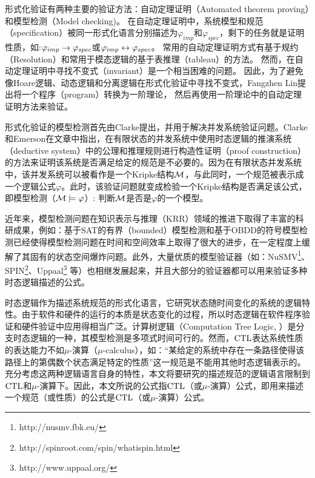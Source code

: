 形式化验证有两种主要的验证方法：自动定理证明（Automated theorem proving）和模型检测（Model checking)。
在自动定理证明中，系统模型和规范（specification）被同一形式化语言分别描述为$\varphi_{imp}$和$\varphi_{spec}$，剩下的任务就是证明性质，如:$\varphi_{imp}\rightarrow \varphi_{spec}$或$\varphi_{imp}\leftrightarrow\varphi_{spec}$。
常用的自动定理证明方式有基于规约（Resolution）\cite{DBLP:journals/jacm/Robinson65}和常用于模态逻辑的基于表推理（tableau）\cite{hughes1996new}的方法。
然而，在自动定理证明中寻找不变式（invariant）是一个相当困难的问题。
因此，为了避免像Hoare逻辑\cite{Hoare1969}、动态逻辑\cite{harel1979first}和分离逻辑\cite{DBLP:conf/lics/Reynolds02}在形式化验证中寻找不变式，Fangzhen Lin提出将一个程序（program）转换为一阶理论，
然后再使用一阶理论中的自动定理证明方法来验证\cite{DBLP:journals/ai/Lin16}。

形式化验证的模型检测首先由Clarke提出，并用于解决并发系统验证问题\cite{DBLP:conf/spin/Clarke08}。Clarke和Emerson在文章\cite{clarke1981design}中指出，在有限状态的并发系统中使用时态逻辑的推演系统（deductive system）中的公理和推理规则进行构造性证明（proof construction）的方法来证明该系统是否满足给定的规范是不必要的。因为在有限状态并发系统中，该并发系统可以被看作是一个Kripke结构${\cal M}$，与此同时，一个规范被表示成一个逻辑公式$\varphi$。此时，该验证问题就变成检验一个Kripke结构是否满足该公式，即模型检测（${\cal M}\models \varphi$）: 判断${\cal M}$是否是$\varphi$的一个模型。

近年来，模型检测问题在知识表示与推理（KRR）领域的推进下取得了丰富的科研成果，例如：基于SAT的有界（bounded）模型检测\cite{DBLP:journals/ac/BiereCCSZ03}和基于OBDD的符号模型检测\cite{burch1992symbolic}已经使得模型检测问题在时间和空间效率上取得了很大的进步，在一定程度上缓解了其固有的状态空间爆炸问题。此外，大量优质的模型验证器（如：NuSMV\footnote{http://nusmv.fbk.eu/}、SPIN\footnote{http://spinroot.com/spin/whatispin.html}、Uppaal\footnote{http://www.uppaal.org/} 等）也相继发展起来，并且大部分的验证器都可以用来验证多种时态逻辑描述的公式。  
       
时态逻辑作为描述系统规范的形式化语言，它研究状态随时间变化的系统的逻辑特性。由于软件和硬件的运行的本质是状态变化的过程，所以时态逻辑在软件程序验证和硬件验证中应用得相当广泛。计算树逻辑（Computation Tree Logic, \CTL）是分支时态逻辑的一种，其模型检测是多项式时间可行的。然而，$\textrm{CTL}$表达系统性质的表达能力不如$\mu$-演算（$\mu$-calculus），如：“某给定的系统中存在一条路径使得该路径上的第偶数个状态满足特定的性质”这一规范是不能用其他时态逻辑表示的\cite{DBLP:series/txtcs/Schneider04}。充分考虑这两种逻辑语言自身的特性，本文将要研究的描述规范的逻辑语言限制到$\textrm{CTL}$和$\mu$-演算下。因此，本文所说的公式指$\textrm{CTL}$（或$\mu$-演算）公式，即用来描述一个规范（或性质）的公式是$\textrm{CTL}$（或$\mu$-演算）公式。




